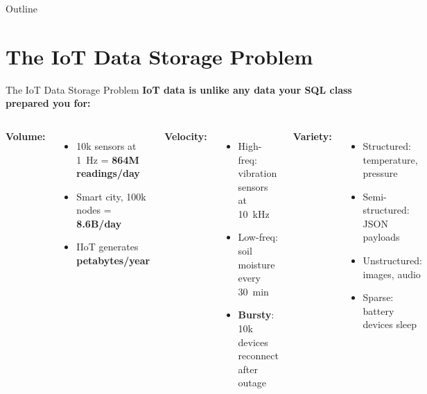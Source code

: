 \documentclass[aspectratio=169,11pt]{beamer}
\begin{document}
\begin{frame}{Outline}
    \tableofcontents
\end{frame}

\section{The IoT Data Storage Problem}

\begin{frame}{The IoT Data Storage Problem}
    \small
    \textbf{IoT data is unlike any data your SQL class prepared you for:}

    \vspace{0.05cm}
    \begin{columns}
        \textbf{Volume:}
        \begin{itemize}\setlength{\itemsep}{0pt}
            \item 10k sensors at 1~Hz = \textbf{864M readings/day}
            \item Smart city, 100k nodes = \textbf{8.6B/day}
            \item IIoT generates \textbf{petabytes/year}
        \end{itemize}

        \vspace{0.05cm}
        \textbf{Velocity:}
        \begin{itemize}\setlength{\itemsep}{0pt}
            \item High-freq: vibration sensors at 10~kHz
            \item Low-freq: soil moisture every 30~min
            \item \textbf{Bursty}: 10k devices reconnect after outage
        \end{itemize}

        \textbf{Variety:}
        \begin{itemize}\setlength{\itemsep}{0pt}
            \item Structured: temperature, pressure
            \item Semi-structured: JSON payloads
            \item Unstructured: images, audio
            \item Sparse: battery devices sleep
        \end{itemize}


\end{columns}
\end{frame}
\end{document}
